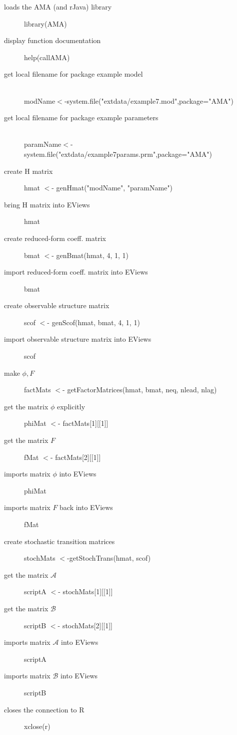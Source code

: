 \documentclass[12pt]{article}
\begin{document}
\newcommand{\anEx}[2]{\item[#1]{{\color{blue} #2}}}

\begin{description}
\anEx{ loads the AMA (and rJava) library }{ library(AMA)}
\anEx{display function documentation}{ help(callAMA)}
\anEx{get local filename for package example model}{\ \\modName$<$-system.file("extdata/example7.mod",package="AMA")}
\anEx{get local filename for package example parameters}{\ \\paramName$<$-system.file("extdata/example7params.prm",package="AMA")}
\anEx{create H matrix }{ hmat $<$- genHmat("modName", "paramName") }
\anEx{bring H matrix into EViews }{ hmat }
\anEx{create reduced-form coeff. matrix }{ bmat $<$- genBmat(hmat, 4, 1, 1) }
\anEx{import reduced-form coeff. matrix into EViews }{ bmat}
\anEx{create observable structure  matrix }{ scof $<$- genScof(hmat, bmat, 4, 1, 1)}
\anEx{import observable structure matrix into EViews }{ scof}
\anEx{make $\phi, F$}{ factMats $<$- getFactorMatrices(hmat, bmat, neq, nlead, nlag)}
\anEx{ get the matrix $\phi$ explicitly}{ phiMat $<$- factMats[1][[1]]}
\anEx{get the matrix $F$}{ fMat $<$- factMats[2][[1]]}
\anEx{imports matrix $\phi$ into EViews}{ phiMat}
\anEx{imports matrix $F$ back into EViews}{ fMat}
\anEx{create stochastic transition matrices}{ stochMats $<$-getStochTrans(hmat, scof) }
\anEx{get the matrix $\mathcal{A}$}{ scriptA $<$- stochMats[1][[1]]}
\anEx{get the matrix $\mathcal{B}$}{ scriptB $<$- stochMats[2][[1]]}
\anEx{imports matrix $\mathcal{A}$ into EViews}{ scriptA}
\anEx{imports matrix $\mathcal{B}$ into EViews}{ scriptB}
\anEx{closes the connection to R}{xclose(r)}
\end{description}
\end{document}
